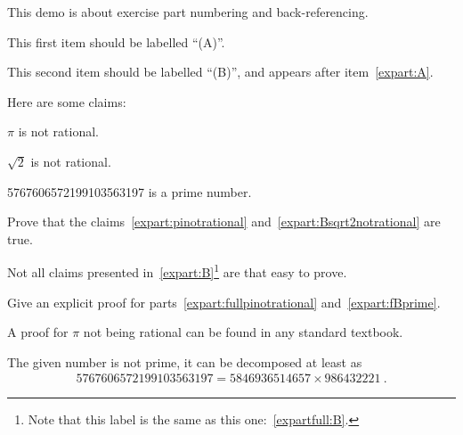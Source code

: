 \documentclass[11pt,a4paper]{article}
\begin{document}
\MakeUebungHeader


This demo is about exercise part numbering and back-referencing.

\begin{exenumerate}
\item \label{expart:A}
  This first item should be labelled ``(A)''.

\item \label{expart:B} \exenumfull\label{expartfull:B}
  This second item should be labelled ``(B)'', and appears after item~\ref{expart:A}.

  Here are some claims:
  \begin{exenumerate}
  \item \label{expart:pinotrational} \exenumfull\label{expart:fullpinotrational}
    $\pi$ is not rational.
  \item \label{expart:Bsqrt2notrational}
    $\sqrt{2}$ is not rational.
  \item \exenumfull\label{expart:fBprime}
    5767606572199103563197 is a prime number.
  \end{exenumerate}

  Prove that the claims~\ref{expart:pinotrational} and~\ref{expart:Bsqrt2notrational} are
  true.

\end{exenumerate}  


Not all claims presented in~\ref{expart:B}\footnote{Note that this label is the same as
  this one:~\ref{expartfull:B}.} are that easy to prove.

\begin{exenumerate} %
\item Give an explicit proof for parts~\ref{expart:fullpinotrational}
  and~\ref{expart:fBprime}.

  \begin{solution}
    A proof for $\pi$ not being rational can be found in any standard textbook.


    The given number is not prime, it can be decomposed at least as
    \begin{align}
      5767606572199103563197 = 5846936514657 \times 986432221\ .
    \end{align}
  \end{solution}
\end{exenumerate}
\end{document}
